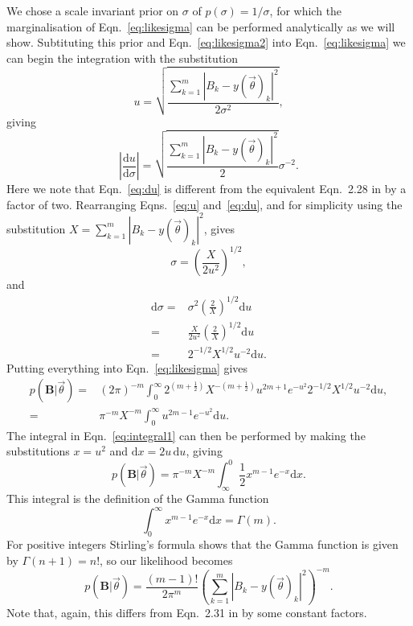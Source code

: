 We chose a scale invariant prior on $\sigma$ of $p(\sigma) = 1/\sigma$, for which the marginalisation of
Eqn.~\ref{eq:likesigma} can be performed analytically as we will show.
Subtituting this prior and Eqn.~\ref{eq:likesigma2} into Eqn.~\ref{eq:likesigma} we can begin the
integration with the substitution
\begin{equation}\label{eq:u}
u = \sqrt{\frac{\sum_{k=1}^m|B_k-y(\vec{\theta})_k|^2}{2\sigma^2}},
\end{equation}
giving
\begin{equation}\label{eq:du}
\left|\frac{\text{d}u}{\text{d}\sigma}\right| = \sqrt{\frac{\sum_{k=1}^m|B_k-y(\vec{\theta})_k|^2}{2}}\sigma^{-2}.
\end{equation}
Here we note that Eqn.~\ref{eq:du} is different from the equivalent Eqn.~2.28 in \citet{Dupuisthesis} by a
factor of two. Rearranging Eqns.~\ref{eq:u} and~\ref{eq:du}, and for simplicity using the substitution $X =
\sum_{k=1}^m |B_k-y(\vec{\theta})_k|^2$, gives
\begin{equation}
\sigma = \left(\frac{X}{2u^2}\right)^{1/2},
\end{equation}
and
\begin{align}
\text{d}\sigma = & \sigma^2 \left(\frac{2}{X}\right)^{1/2} \text{d}u
\nonumber \\
 = & \frac{X}{2u^2} \left(\frac{2}{X}\right)^{1/2} \text{d}u \nonumber \\
 = & 2^{-1/2} X^{1/2} u^{-2} \text{d}u.
\end{align}
Putting everything into Eqn.~\ref{eq:likesigma} gives
\begin{align}
p(\mathbf{B}|\vec{\theta})= & (2\pi)^{-m} \int_0^{\infty} 2^{(m+\frac{1}{2})}
X^{-(m+\frac{1}{2})} u^{2m+1} e^{-u^2} 2^{-1/2} X^{1/2} u^{-2} \text{d}u, \nonumber \\
 = & \pi^{-m} X^{-m} \int_0^{\infty} u^{2m-1} e^{-u^2} \text{d}u. \label{eq:integral1}
\end{align}
The integral in Eqn.~\ref{eq:integral1} can then be performed by making the substitutions $x = u^2$ and $\text{d}x
= 2u\,\text{d}u$, giving
\begin{equation}
p(\mathbf{B}|\vec{\theta}) = \pi^{-m} X^{-m} \int_{\infty}^0 \frac{1}{2} x^{m-1} e^{-x}
\text{d}x.
\end{equation}
This integral is the definition of the Gamma function
\begin{equation}
 \int_0^{\infty} x^{m-1} e^{-x} \text{d}x = \Gamma(m).
\end{equation}
For positive integers Stirling's formula shows that the Gamma function is given by $\Gamma(n+1) = n!$, so our
likelihood becomes
\begin{equation}\label{eq:complex}
p(\mathbf{B}|\vec{\theta}) = \frac{(m-1)!}{2\pi^m} \left(\sum_{k=1}^m
|B_k-y(\vec{\theta})_k|^2\right)^{-m}.
\end{equation}
Note that, again, this differs from Eqn.~2.31 in \citet{Dupuisthesis} by some constant factors.

